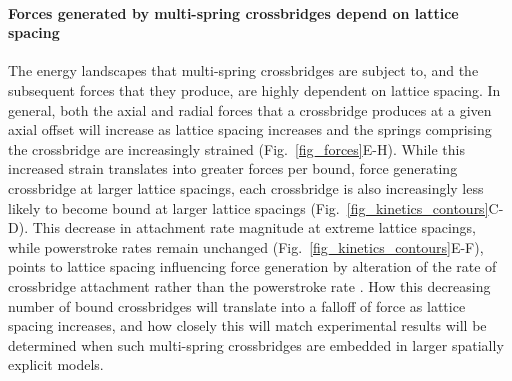 \documentclass[]{article}
\begin{document}
\paragraph{Forces generated by multi-spring crossbridges depend on lattice spacing} %
The energy landscapes that multi-spring crossbridges are subject to, and the subsequent forces that they produce, are highly dependent on lattice spacing.
In general, both the axial and radial forces that a crossbridge produces at a given axial offset will increase as lattice spacing increases and the springs comprising the crossbridge are increasingly strained (Fig.~\ref{fig_forces}E-H). 
While this increased strain translates into greater forces per bound, force generating crossbridge at larger lattice spacings, each crossbridge is also increasingly less likely to become bound at larger lattice spacings (Fig.~\ref{fig_kinetics_contours}C-D).
This decrease in attachment rate magnitude at extreme lattice spacings, while powerstroke rates remain unchanged (Fig.~\ref{fig_kinetics_contours}E-F), points to lattice spacing influencing force generation by alteration of the rate of crossbridge attachment rather than the powerstroke rate \citet{Martyn2004}. 
How this decreasing number of bound crossbridges will translate into a falloff of force as lattice spacing increases, and how closely this will match experimental results will be determined when such multi-spring crossbridges are embedded in larger spatially explicit models. %
\end{document}
